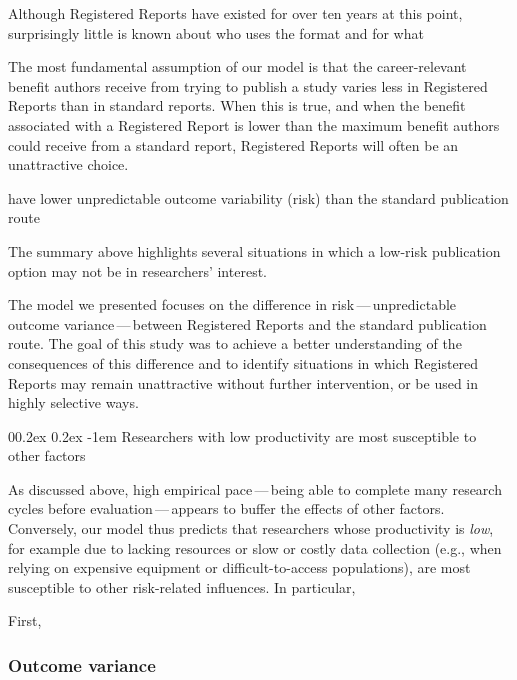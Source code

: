 \documentclass[
  ,man,mask,floatsintext]{apa6}
\makeatletter
\let\oldparagraph\paragraph
\renewcommand{\paragraph}[1]{\oldparagraph{#1}\mbox{}}
\renewcommand{\paragraph}{\@startsection{paragraph}{4}{\parindent}%
  {0\baselineskip \@plus 0.2ex \@minus 0.2ex}%
  {-1em}%
  {\normalfont\normalsize\bfseries\itshape\typesectitle}}
\makeatother
\begin{document}
Although Registered Reports have existed for over ten years at this point, surprisingly little is known about who uses the format and for what

The most fundamental assumption of our model is that the career-relevant benefit authors receive from trying to publish a study varies less in Registered Reports than in standard reports.
When this is true, and when the benefit associated with a Registered Report is lower than the maximum benefit authors could receive from a standard report, Registered Reports will often be an unattractive choice.

have lower unpredictable outcome variability (risk) than the standard publication route

The summary above highlights several situations in which a low-risk publication option may not be in researchers' interest.

The model we presented focuses on the difference in risk\(\,\)---\(\,\)unpredictable outcome variance\(\,\)---\(\,\)between Registered Reports and the standard publication route.
The goal of this study was to achieve a better understanding of the consequences of this difference and to identify situations in which Registered Reports may remain unattractive without further intervention, or be used in highly selective ways.

\hypertarget{researchers-with-low-productivity-are-most-susceptible-to-other-factors}{%
\paragraph{Researchers with low productivity are most susceptible to other factors}\label{researchers-with-low-productivity-are-most-susceptible-to-other-factors}}

As discussed above, high empirical pace\(\,\)---\(\,\)being able to complete many research cycles before evaluation\(\,\)---\(\,\)appears to buffer the effects of other factors.
Conversely, our model thus predicts that researchers whose productivity is \emph{low}, for example due to lacking resources or slow or costly data collection (e.g., when relying on expensive equipment or difficult-to-access populations), are most susceptible to other risk-related influences.
In particular,

First,

\hypertarget{outcome-variance}{%
\subsubsection{Outcome variance}\label{outcome-variance}}
\end{document}
